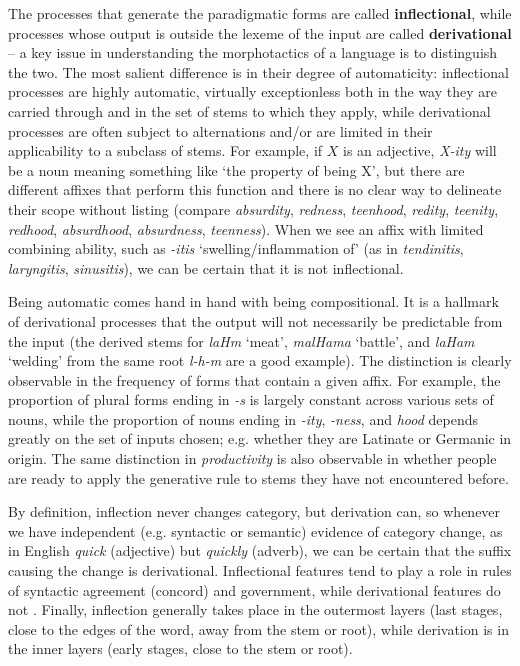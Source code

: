 The processes that generate the paradigmatic forms are called {\bf
  inflectional}, while processes whose output is outside the lexeme of the
input are called {\bf derivational} -- a key issue in understanding the
morphotactics of a language is to distinguish the two. The most salient
difference is in their degree of automaticity: inflectional processes are
highly automatic, virtually exceptionless both in the way they are carried
through and in the set of stems to which they apply, while derivational
processes are often subject to alternations and/or are limited in their
applicability to a subclass of stems. For example, if $X$ is an adjective,
{\it X-ity} will be a noun meaning something like `the property of being X',
but there are different affixes that perform this function and there is no
clear way to delineate their scope without listing (compare {\it absurdity},
{\it redness}, {\it teenhood}, {\it *redity}, {\it *teenity}, {\it *redhood},
{\it *absurdhood}, {\it *absurdness}, {\it *teenness}).  When we see an affix
with limited combining ability, such as {\it -itis} `swelling/inflammation of'
(as in {\it tendinitis}, {\it laryngitis}, {\it sinusitis}), we can be certain
that it is not inflectional.

Being automatic comes hand in hand with being compositional. It is a hallmark
of derivational processes that the output will not necessarily be predictable
from the input (the derived stems for {\it laHm} `meat', {\it malHama}
`battle', and {\it laHam} `welding' from the same root {\it l-h-m} are a good
example).  The distinction is clearly observable in the frequency of forms
that contain a given affix. For example, the proportion of plural forms ending
in {\it -s} is largely constant across various sets of nouns, while the
proportion of nouns ending in {\it -ity}, {\it -ness}, and {\it \-hood}
depends greatly on the set of inputs chosen; e.g.  whether they are Latinate
or Germanic in origin. The same distinction in {\it productivity} is also
observable in whether people are ready to apply the generative rule to stems
they have not encountered before.  

By definition, inflection never changes category, but derivation can, so
whenever we have independent (e.g. syntactic or semantic) evidence of category
change, as in English {\it quick} (adjective) but {\it quickly} (adverb), we
can be certain that the suffix causing the change is derivational.
Inflectional features tend to play a role in rules of syntactic agreement
(concord) and government, while derivational features do not
\cite{Anderson:1982}. Finally, inflection generally takes place in the
outermost layers (last stages, close to the edges of the word, away from the
stem or root), while derivation is in the inner layers (early stages, close to
the stem or root).

